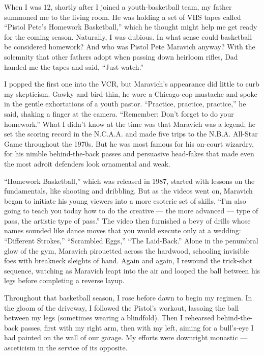 When I was 12, shortly after I joined a youth-basketball team, my father
summoned me to the living room. He was holding a set of VHS tapes called
``Pistol Pete's Homework Basketball,'' which he thought might help me
get ready for the coming season. Naturally, I was dubious. In what sense
could basketball be considered homework? And who was Pistol Pete
Maravich anyway? With the solemnity that other fathers adopt when
passing down heirloom rifles, Dad handed me the tapes and said, ``Just
watch.''

I popped the first one into the VCR, but Maravich's appearance did
little to curb my skepticism. Gawky and bird-thin, he wore a Chicago-cop
mustache and spoke in the gentle exhortations of a youth pastor.
``Practice, practice, practice,'' he said, shaking a finger at the
camera. ``Remember: Don't forget to do your homework.'' What I didn't
know at the time was that Maravich was a legend; he set the scoring
record in the N.C.A.A. and made five trips to the N.B.A. All-Star Game
throughout the 1970s. But he was most famous for his on-court wizardry,
for his nimble behind-the-back passes and persuasive head-fakes that
made even the most adroit defenders look ornamental and weak.

``Homework Basketball,'' which was released in 1987, started with
lessons on the fundamentals, like shooting and dribbling. But as the
videos went on, Maravich began to initiate his young viewers into a more
esoteric set of skills. ``I'm also going to teach you today how to do
the creative --- the more advanced --- type of pass, the artistic type
of pass.'' The video then furnished a bevy of drills whose names sounded
like dance moves that you would execute only at a wedding: ``Different
Strokes,'' ``Scrambled Eggs,'' ``The Laid-Back.'' Alone in the penumbral
glow of the gym, Maravich pirouetted across the hardwood, schooling
invisible foes with breakneck sleights of hand. Again and again, I
rewound the trick-shot sequence, watching as Maravich leapt into the air
and looped the ball between his legs before completing a reverse layup.

Throughout that basketball season, I rose before dawn to begin my
regimen. In the gloom of the driveway, I followed the Pistol's workout,
lassoing the ball between my legs (sometimes wearing a blindfold). Then
I rehearsed behind-the-back passes, first with my right arm, then with
my left, aiming for a bull's-eye I had painted on the wall of our
garage. My efforts were downright monastic --- asceticism in the service
of its opposite.

